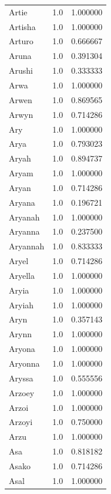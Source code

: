 \documentclass[
  letterpaper,
  DIV=11,
  numbers=noendperiod]{scrreprt}
\begin{document}
\begin{tabular}{lrr}
Artie           &   1.0 &   1.000000 \\
Artisha         &   1.0 &   1.000000 \\
Arturo          &   1.0 &   0.666667 \\
Aruna           &   1.0 &   0.391304 \\
Arushi          &   1.0 &   0.333333 \\
Arwa            &   1.0 &   1.000000 \\
Arwen           &   1.0 &   0.869565 \\
Arwyn           &   1.0 &   0.714286 \\
Ary             &   1.0 &   1.000000 \\
Arya            &   1.0 &   0.793023 \\
Aryah           &   1.0 &   0.894737 \\
Aryam           &   1.0 &   1.000000 \\
Aryan           &   1.0 &   0.714286 \\
Aryana          &   1.0 &   0.196721 \\
Aryanah         &   1.0 &   1.000000 \\
Aryanna         &   1.0 &   0.237500 \\
Aryannah        &   1.0 &   0.833333 \\
Aryel           &   1.0 &   0.714286 \\
Aryella         &   1.0 &   1.000000 \\
Aryia           &   1.0 &   1.000000 \\
Aryiah          &   1.0 &   1.000000 \\
Aryn            &   1.0 &   0.357143 \\
Arynn           &   1.0 &   1.000000 \\
Aryona          &   1.0 &   1.000000 \\
Aryonna         &   1.0 &   1.000000 \\
Aryssa          &   1.0 &   0.555556 \\
Arzoey          &   1.0 &   1.000000 \\
Arzoi           &   1.0 &   1.000000 \\
Arzoyi          &   1.0 &   0.750000 \\
Arzu            &   1.0 &   1.000000 \\
Asa             &   1.0 &   0.818182 \\
Asako           &   1.0 &   0.714286 \\
Asal            &   1.0 &   1.000000 \\

\end{tabular}
\end{document}
